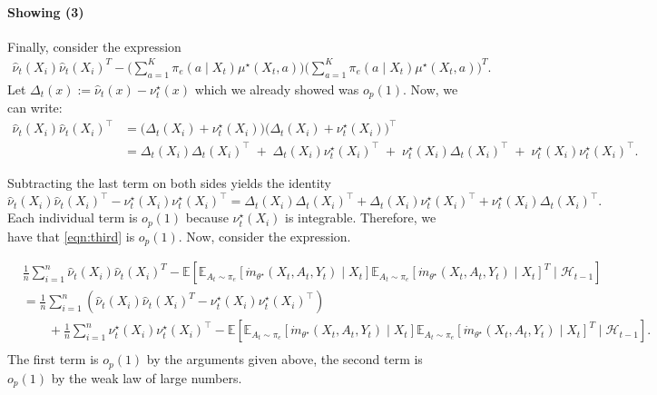 \documentclass[11pt]{article}
\newcommand{\E}{\mathbb{E}}
\begin{document}
\begin{appendix}
\paragraph{Showing (3)} Finally, consider the expression 
\begin{align} \hat{\nu}_{t}(X_i)\hat{\nu}_{t}(X_i)^{T}
-  \Big(\sum_{a=1}^{K} \pi_e(a \mid X_t) \mu^\star(X_t,a)\Big)\Big(\sum_{a=1}^{K} \pi_e(a \mid X_t) \mu^\star(X_t,a)\Big)^{T} . \label{eqn:third}
\end{align}
Let $\Delta_t(x) := \widehat{\nu}_t(x) - \nu_t^\star(x)$ which we already showed was $o_{p}(1)$. Now, we can write:
\begin{align*}
\widehat{\nu}_t(X_i)\widehat{\nu}_t(X_i)^{\!\top}
&=
\big(\Delta_t(X_i) + \nu_t^\star(X_i)\big)
\big(\Delta_t(X_i) + \nu_t^\star(X_i)\big)^{\!\top} \\
&=
\Delta_t(X_i)\Delta_t(X_i)^{\!\top}
\;+\;
\Delta_t(X_i)\nu_t^\star(X_i)^{\!\top}
\;+\;
\nu_t^\star(X_i)\Delta_t(X_i)^{\!\top}
\;+\;
\nu_t^\star(X_i)\nu_t^\star(X_i)^{\!\top}.
\end{align*}

Subtracting the last term on both sides yields the identity
\[
\widehat{\nu}_t(X_i)\widehat{\nu}_t(X_i)^{\!\top}
-
\nu_t^\star(X_i)\nu_t^\star(X_i)^{\!\top}
=
\Delta_t(X_i)\Delta_t(X_i)^{\!\top}
+
\Delta_t(X_i)\nu_t^\star(X_i)^{\!\top}
+
\nu_t^\star(X_i)\Delta_t(X_i)^{\!\top}.
\]
Each individual term is $o_{p}(1)$ because $\nu_t^\star(X_i)$ is integrable. Therefore, we have that \cref{eqn:third} is $o_p(1)$. Now, consider the expression. 


\begin{align*} &\frac{1}{n}\sum_{i=1}^{n}\hat{\nu}_{t}(X_i)\hat{\nu}_{t}(X_i)^{T}
- \E\left[\E_{A_{t} \sim \pi_{e}}  \left[\dot{m}_{\theta^{\star}}(X_t,A_{t},Y_t) \mid X_t\right]\E_{A_{t} \sim \pi_{e}}  \left[\dot{m}_{\theta^{\star}}(X_t,A_{t},Y_t) \mid X_t\right]^{T} \mid \mathcal{H}_{t-1}\right] \\
&=\frac{1}{n}\sum_{i=1}^{n}\left(\hat{\nu}_{t}(X_i)\hat{\nu}_{t}(X_i)^{T}
- \nu_t^\star(X_i)\nu_t^\star(X_i)^{\!\top}\right) \\
&\qquad +\frac{1}{n}\sum_{i=1}^{n}\nu_t^\star(X_i)\nu_t^\star(X_i)^{\!\top}-\E\left[\E_{A_{t} \sim \pi_{e}}  \left[\dot{m}_{\theta^{\star}}(X_t,A_{t},Y_t) \mid X_t\right]\E_{A_{t} \sim \pi_{e}}  \left[\dot{m}_{\theta^{\star}}(X_t,A_{t},Y_t) \mid X_t\right]^{T} \mid \mathcal{H}_{t-1}\right].\\
\end{align*}
The first term is $o_{p}(1)$ by the arguments given above, the second term is $o_{p}(1)$ by the weak law of large numbers. 

\end{appendix}
\end{document}

